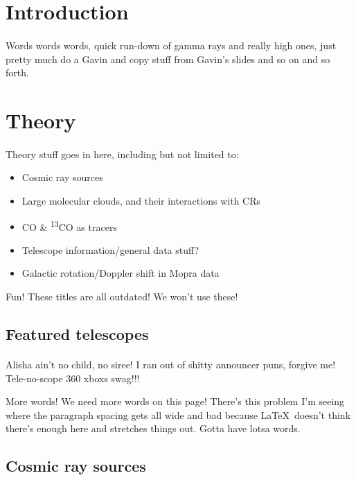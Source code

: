 \documentclass[a4paper, titlepage, oneside]{article}
\newcommand{\elem}[2]{\textsuperscript{#1}{#2}}
\begin{document}
\begin{multicols}{2}
\section{Introduction}
\paragraph{}
Words words words, quick run-down of gamma rays and really high ones, just pretty much do a Gavin and copy stuff from Gavin's slides and so on and so forth.

\section{Theory}
\paragraph{}
Theory stuff goes in here, including but not limited to:
\begin{itemize}
  \item Cosmic ray sources
  \item Large molecular clouds, and their interactions with CRs
  \item CO \& \elem{13}{CO} as tracers
  \item Telescope information/general data stuff?
  \item Galactic rotation/Doppler shift in Mopra data
\end{itemize}
Fun! These titles are all outdated! We won't use these!

\subsection{Featured telescopes}
\paragraph{}
Alisha ain't no child, no siree! I ran out of shitty announcer puns, forgive me! Tele-no-scope 360 xboxs swag!!!

More words! We need more words on this page! There's this problem I'm seeing where the paragraph spacing gets all wide and bad because \LaTeX~doesn't think there's enough here and stretches things out. Gotta have lotsa words.

\subsection{Cosmic ray sources}

\end{multicols}
\end{document}
